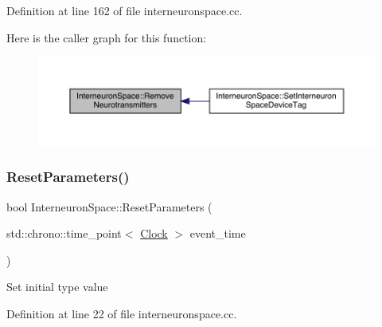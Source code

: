 Definition at line 162 of file interneuronspace.\+cc.

Here is the caller graph for this function\+:\nopagebreak
\begin{figure}[H]
\begin{center}
\leavevmode
\includegraphics[width=350pt]{class_interneuron_space_a7b11f542ab7a3d293d5fcf5a1b522ac2_icgraph}
\end{center}
\end{figure}
\mbox{\label{class_interneuron_space_a3a9776e4a77b87374204468ca7974157}} 
\subsubsection{\texorpdfstring{Reset\+Parameters()}{ResetParameters()}}
{\footnotesize\ttfamily bool Interneuron\+Space\+::\+Reset\+Parameters (\begin{DoxyParamCaption}\item[{std\+::chrono\+::time\+\_\+point$<$ \hyperlink{universe_8h_a0ef8d951d1ca5ab3cfaf7ab4c7a6fd80}{Clock} $>$}]{event\+\_\+time }\end{DoxyParamCaption})}

Set initial type value 

Definition at line 22 of file interneuronspace.\+cc.

